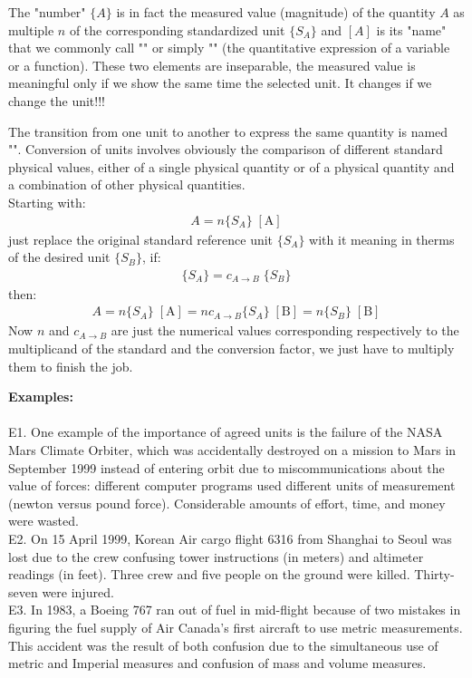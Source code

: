	The "number" $\{A\}$ is in fact the measured value (magnitude) of the quantity $A$ as multiple $n$ of the corresponding standardized unit $\{S_A\}$ and $[A]$ is its "name" that we commonly call "" or simply "" (the quantitative expression of a variable or a function). These two elements are inseparable, the measured value is meaningful only if we show the same time the selected unit. It changes if we change the unit!!!
	\begin{tcolorbox}[title=Remarks,colframe=black,arc=10pt]
	The transition from one unit to another to express the same quantity is named "". Conversion of units involves obviously the comparison of different standard physical values, either of a single physical quantity or of a physical quantity and a combination of other physical quantities.\\
	
	Starting with:
	\begin{gather*}
		A=n\{S_A\}\; [\text{A}]
	\end{gather*}
	just replace the original standard reference unit $\{S_A\}$ with it meaning in therms of the desired unit $\{S_B\}$, if:
	\begin{gather*}
		\{S_A\}=c_{A\rightarrow B}\;  \{S_B\}
	\end{gather*}
	then:
	\begin{gather*}
		A=n\{S_A\}\; [\text{A}]=nc_{A\rightarrow B} \{S_A\}\; [\text{B}]=n \{S_B\}\; [\text{B}]
	\end{gather*}
	Now $n$ and $c_{A\rightarrow B}$ are just the numerical values corresponding respectively to the multiplicand of the standard and the conversion factor, we just have to multiply them to finish the job.
	\end{tcolorbox}
	\begin{tcolorbox}[colframe=black,colback=white,sharp corners]
	\textbf{{\Large {}}Examples:}\\\\
	E1. One example of the importance of agreed units is the failure of the NASA Mars Climate Orbiter, which was accidentally destroyed on a mission to Mars in September 1999 instead of entering orbit due to miscommunications about the value of forces: different computer programs used different units of measurement (newton versus pound force). Considerable amounts of effort, time, and money were wasted.\\

	E2. On 15 April 1999, Korean Air cargo flight 6316 from Shanghai to Seoul was lost due to the crew confusing tower instructions (in meters) and altimeter readings (in feet). Three crew and five people on the ground were killed. Thirty-seven were injured. \\

	E3. In 1983, a Boeing 767 ran out of fuel in mid-flight because of two mistakes in figuring the fuel supply of Air Canada's first aircraft to use metric measurements. This accident was the result of both confusion due to the simultaneous use of metric and Imperial measures and confusion of mass and volume measures.
	\end{tcolorbox}
